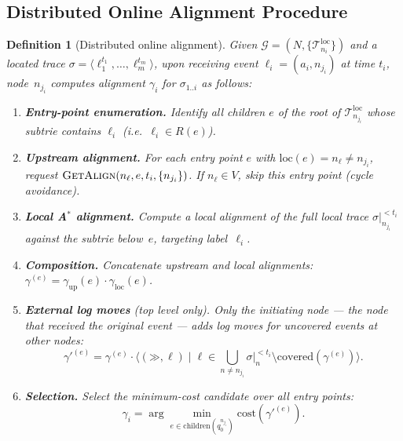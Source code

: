 \documentclass[11pt,a4paper]{article}
\newcommand{\new}[1]{{\color{Blue}#1}}         %
\newtheorem{definition}{Definition}
\newcommand{\loc}{\mathrm{loc}}
\newcommand{\Nodes}{N}
\newcommand{\Net}{\mathcal{G}}
\newcommand{\T}{\mathcal{T}}
\newcommand{\Tl}{\T^{\mathrm{loc}}}
\newcommand{\cost}{\mathrm{cost}}
\newcommand{\alignment}{\gamma}
\newcommand{\SKIP}{\mathord{\gg}}
\newcommand{\trace}{\sigma}
\newcommand{\GA}{\textsc{GetAlign}}
\newcommand{\cov}{\mathrm{covered}}
\begin{document}
\subsection{Distributed Online Alignment Procedure}

\begin{definition}[Distributed online alignment]%
  \label{def:dist-online-align}
  Given $\Net = (\Nodes, \{\Tl_{n_i}\})$ and a located trace
  $\trace = \langle \ell_1^{t_1}, \ldots, \ell_m^{t_m} \rangle$,
  upon receiving event $\ell_i = (a_i, n_{j_i})$ at time $t_i$,
  node~$n_{j_i}$ computes alignment $\alignment_i$ for
  $\trace_{1..i}$ as follows:

  \begin{enumerate}
    \item \textbf{Entry-point enumeration.}\;
      Identify all children $e$ of the root of $\Tl_{n_{j_i}}$ whose
      subtrie contains $\ell_i$ (i.e.\ $\ell_i \in R(e)$).

    \item \textbf{Upstream alignment.}\;
      For each entry point $e$ with $\loc(e) = n_\ell \neq n_{j_i}$,
      request $\GA(n_\ell, e, t_i, \{n_{j_i}\})$.
      If $n_\ell \in V$, skip this entry point (cycle avoidance).

    \item \textbf{Local A$^{*}$ alignment.}\;
      Compute a local alignment of the \new{full local trace}
      $\trace|_{n_{j_i}}^{< t_i}$ against the subtrie below~$e$,
      targeting label~$\ell_i$.

    \item \textbf{Composition.}\;
      Concatenate upstream and local alignments:
      $\alignment^{(e)} = \alignment_{\mathrm{up}}(e) \cdot
       \alignment_{\mathrm{loc}}(e)$.

    \item \textbf{External log moves} (top level only).
      \new{Only the initiating node} — the node that received the
      original event — adds log moves for uncovered events at other nodes:
      \[
        \alignment'^{(e)} = \alignment^{(e)} \cdot
        \bigl\langle (\SKIP, \ell) \mid
          \ell \in \textstyle\bigcup_{n \neq n_{j_i}} \trace|_n^{< t_i}
          \setminus \cov(\alignment^{(e)}) \bigr\rangle.
      \]

    \item \textbf{Selection.}\;
      Select the minimum-cost candidate over all entry points:
      \[
        \alignment_i
        = \arg\min_{e \in \mathrm{children}(q_0^{n_{j_i}})}
          \cost(\alignment'^{(e)}).
      \]
  \end{enumerate}
\end{definition}
\end{document}
